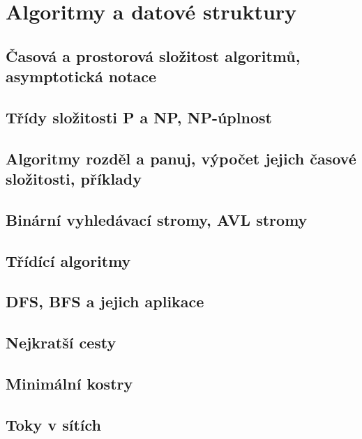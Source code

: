 \documentclass[../../main.tex]{subfiles}
\begin{document}
\section{Algoritmy a datové struktury}

\subsection{Časová a prostorová složitost algoritmů, asymptotická notace}
\subsection{Třídy složitosti P a NP, NP-úplnost}
\subsection{Algoritmy rozděl a panuj, výpočet jejich časové složitosti, příklady}
\subsection{Binární vyhledávací stromy, AVL stromy}
\subsection{Třídící algoritmy}
\subsection{DFS, BFS a jejich aplikace}
\subsection{Nejkratší cesty}
\subsection{Minimální kostry}
\subsection{Toky v sítích}
\end{document}
